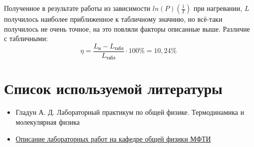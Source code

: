 \documentclass[a4paper,11.5pt]{article} %
\begin{document}
Полученное в результате работы из зависимости $ln(P)\left(\frac{1}{T}\right)$ при нагревании, $L$ получилось наиболее приближенное к табличному значнию, но всё-таки  получилось не очень точное, на это повляли факторы описанные выше. Различие с табличными:
\begin{equation}
	\eta = \frac{L_\text{н} - L_\text{табл}}{L_\text{табл}}\cdot 100\% = 10,24 \% 
\end{equation}

\section{Список используемой литературы}

\begin{itemize}
\item Гладун А. Д. Лабораторный практикум по общей физике. Термодинамика и молекулярная физика\\

\item \href{https://mipt.ru/education/chair/physics/S_II/lab/}{Описание лабораторных работ на кафедре общей физики МФТИ}
\end{itemize}


\newpage
\end{document}
